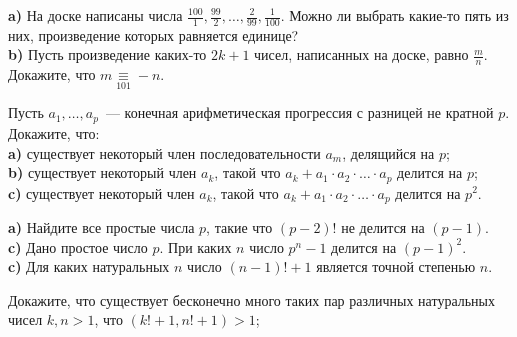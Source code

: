 \begin{problems}
\item \textbf{a)} На доске написаны числа $\frac{100}{1}, \frac{99}{2}, \ldots, \frac{2}{99}, \frac{1}{100}$. Можно ли выбрать какие-то пять из них, произведение которых равняется единице? \\
\textbf{b)} Пусть произведение каких-то $2k+1$ чисел, написанных на доске, равно $\frac{m}{n}$. Докажите, что $m \mathop{\equiv}\limits_{101} -n$.  

\item Пусть $a_1, \ldots, a_p$~--- конечная арифметическая прогрессия с разницей не кратной $p$. Докажите, что: \\
\textbf{a)} существует некоторый член последовательности $a_m$, делящийся на $p$;\\
\textbf{b)} существует некоторый член $a_k$, такой что $a_k+a_1\cdot a_2\cdot\ldots\cdot a_p$ делится на $p$;\\
\textbf{c)} существует некоторый член $a_k$, такой что $a_k+a_1\cdot a_2\cdot\ldots\cdot a_p$ делится на $p^2$.

\item 
\textbf{a)} Найдите все простые числа $p$, такие что $(p-2)!$ не делится на $(p-1)$.\\
\textbf{c)} Дано простое число $p$. При каких $n$ число $p^n-1$ делится на $(p-1)^2$.\\
\textbf{c)} Для каких натуральных $n$ число $(n-1)!+1$ является точной степенью $n$. 


\item Докажите, что существует бесконечно много таких пар различных натуральных чисел 
$k,n>1$, что $(k!+1,n!+1)>1$; 


\end{problems}
